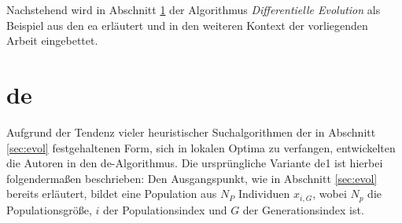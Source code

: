 		Nachstehend wird in Abschnitt \ref{sec:de} der Algorithmus \textit{Differentielle Evolution} als Beispiel aus den \gls{ea} erläutert und in den weiteren Kontext der vorliegenden Arbeit eingebettet.
	

	\section{\gls{de}}
	\label{sec:de}

		Aufgrund der Tendenz vieler heuristischer Suchalgorithmen der in Abschnitt \ref{sec:evol} festgehaltenen Form, sich in lokalen Optima zu verfangen, entwickelten die Autoren in \cite{storn-price-de} den \gls{de}-Algorithmus.
		Die ursprüngliche Variante \gls{de}1 ist hierbei folgendermaßen beschrieben:
		Den Ausgangspunkt, wie in Abschnitt \ref{sec:evol} bereits erläutert, bildet eine Population aus $N_{P}$ Individuen $x_{i, G}$, wobei $N_{p}$ die Populationsgröße, $i$ der Populationsindex und $G$ der Generationsindex ist. 
